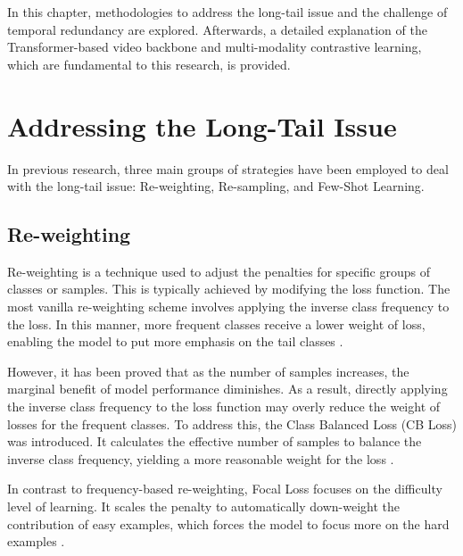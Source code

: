 In this chapter, methodologies to address the long-tail issue and the challenge of temporal redundancy are explored. Afterwards, a detailed explanation of the Transformer-based video backbone and multi-modality contrastive learning, which are fundamental to this research, is provided.

\section{Addressing the Long-Tail Issue}
In previous research, three main groups of strategies have been employed to deal with the long-tail issue: Re-weighting, Re-sampling, and Few-Shot Learning.

\subsection{Re-weighting}
Re-weighting is a technique used to adjust the penalties for specific groups of classes or samples. This is typically achieved by modifying the loss function. The most vanilla re-weighting scheme involves applying the inverse class frequency to the loss. In this manner, more frequent classes receive a lower weight of loss, enabling the model to put more emphasis on the tail classes \parencite{khan2017cost, mostajabi2015feedforward}.

However, it has been proved that as the number of samples increases, the marginal benefit of model performance diminishes. As a result, directly applying the inverse class frequency to the loss function may overly reduce the weight of losses for the frequent classes. To address this, the Class Balanced Loss (CB Loss) was introduced. It calculates the effective number of samples to balance the inverse class frequency, yielding a more reasonable weight for the loss \parencite{cui2019class}.


In contrast to frequency-based re-weighting, Focal Loss focuses on the difficulty level of learning. It scales the penalty to automatically down-weight the contribution of easy examples, which forces the model to focus more on the hard examples \parencite{lin2017focal}.

